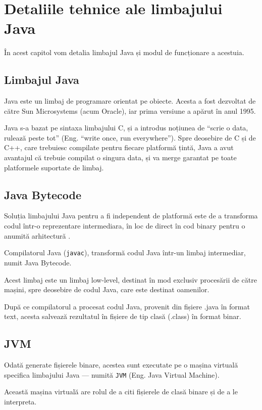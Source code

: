 \chapter{Detaliile tehnice ale limbajului Java}

În acest capitol vom detalia limbajul Java și modul de
funcționare a acestuia.

\section{Limbajul Java}

Java este un limbaj de programare orientat pe obiecte. Acesta a fost
dezvoltat de către Sun Microsystems (acum Oracle), iar prima versiune a
apărut în anul 1995.

Java s-a bazat pe sintaxa limbajului C, și a introdus noțiunea de
``scrie o data, rulează peste tot'' (Eng. ``write once, run
everywhere''). Spre deosebire de C și de C++, care trebuiesc compilate
pentru fiecare platformă țintă, Java a avut avantajul că trebuie
compilat o singura data, și va merge garantat pe toate platformele
suportate de limbaj.

\section{Java Bytecode}

Soluția limbajului Java pentru a fi independent de platformă este de a
transforma codul într-o reprezentare intermediara, în loc de direct în
cod binary pentru o anumită arhitectură .

Compilatorul Java (\texttt{javac}), transformă codul Java într-un limbaj
intermediar, numit Java Bytecode.

Acest limbaj este un limbaj low-level, destinat în mod exclusiv
procesării de către mașini, spre deosebire de codul Java, care este
destinat oamenilor.

După ce compilatorul a procesat codul Java, provenit din fișiere .java în
format text, acesta salvează rezultatul în fișiere de tip clasă (.class)
în format binar.

\section{JVM}

Odată generate fișierele binare, acestea sunt executate pe o mașina
virtuală specifica limbajului Java --- numită \texttt{JVM}
(Eng. Java Virtual Machine).

Această mașina virtuală are rolul de a citi fișierele de clasă binare și
de a le interpreta.

